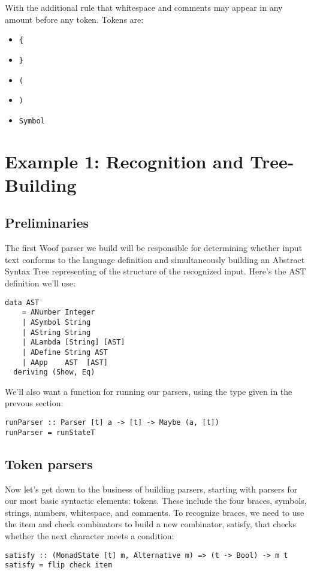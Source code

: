 \documentclass{tmr}
\begin{document}
With the additional rule that whitespace and comments may appear in any 
amount before any token.  Tokens are:
\begin{itemize}
  \item \verb+{+
  \item \verb+}+
  \item \verb+(+
  \item \verb+)+
  \item \verb+Symbol+
\end{itemize}




\section{Example 1: Recognition and Tree-Building}

\subsection{Preliminaries}
The first Woof parser we build will be responsible for determining whether input
text conforms to the language definition and simultaneously building an 
Abstract Syntax Tree representing of the structure of the recognized input.
Here's the AST definition we'll use:
\begin{verbatim}
data AST
    = ANumber Integer
    | ASymbol String
    | AString String
    | ALambda [String] [AST]
    | ADefine String AST
    | AApp    AST  [AST]
  deriving (Show, Eq)
\end{verbatim}

We'll also want a function for running our parsers, using the type given in the
prevous section:
\begin{verbatim}
runParser :: Parser [t] a -> [t] -> Maybe (a, [t])
runParser = runStateT
\end{verbatim}

\subsection{Token parsers}
Now let's get down to the business of building parsers, starting with parsers
for our most basic syntactic elements:  tokens.
These include the four braces, symbols, strings, numbers, whitespace, and comments.
To recognize braces, we need to use the item and check combinators to build a new
 combinator, satisfy, that checks whether the next character meets a condition:
\begin{verbatim}
satisfy :: (MonadState [t] m, Alternative m) => (t -> Bool) -> m t
satisfy = flip check item
\end{verbatim}
\end{document}
